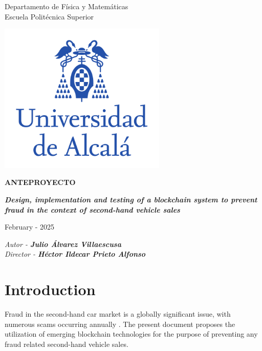 \documentclass[twocolumn]{article}
\begin{document}
\thispagestyle{empty}
\onecolumn
\begin{center}

\begin{large}
Departamento de Física y Matemáticas\\
Escuela Politécnica Superior\\
\end{large}
\vspace{1cm}

\includegraphics[width=8cm]{Images/logo-uah.pdf}

\textbf{ANTEPROYECTO}

\vspace{1cm}

\begin{large}\textbf{\textit{Design, implementation and testing of a blockchain system to prevent fraud in the context of second-hand vehicle sales}}\end{large}

\vfill

February - 2025

\end{center}

\begin{flushright}
\textit{Autor - \textbf{Julio Álvarez Villaescusa}} \\
\textit{Director - \textbf{Héctor Ildecar Prieto Alfonso}}
\end{flushright}

\newpage
\twocolumn
\section{Introduction}
Fraud in the second-hand car market is a globally significant issue, with numerous scams occurring annually \cite{duboka2009second}. The present document proposes the utilization of emerging blockchain technologies for the purpose of preventing any fraud related second-hand vehicle sales.
\end{document}
